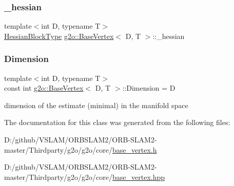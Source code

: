 \mbox{\label{classg2o_1_1_base_vertex_afaf73b0e874db76655d90bdb2f156c00}} 
\subsubsection{\texorpdfstring{\+\_\+hessian}{\_hessian}}
{\footnotesize\ttfamily template$<$int D, typename T$>$ \\
\mbox{\hyperlink{classg2o_1_1_base_vertex_a887928bc60710e0ec9acb269ee7411db}{Hessian\+Block\+Type}} \mbox{\hyperlink{classg2o_1_1_base_vertex}{g2o\+::\+Base\+Vertex}}$<$ D, T $>$\+::\+\_\+hessian\hspace{0.3cm}{\ttfamily [protected]}}

\mbox{\label{classg2o_1_1_base_vertex_a9a831bfdf84cfe625d8f942bc4f1c2d1}} 
\subsubsection{\texorpdfstring{Dimension}{Dimension}}
{\footnotesize\ttfamily template$<$int D, typename T$>$ \\
const int \mbox{\hyperlink{classg2o_1_1_base_vertex}{g2o\+::\+Base\+Vertex}}$<$ D, T $>$\+::Dimension = D\hspace{0.3cm}{\ttfamily [static]}}



dimension of the estimate (minimal) in the manifold space 



The documentation for this class was generated from the following files\+:\begin{DoxyCompactItemize}
\item 
D\+:/github/\+V\+S\+L\+A\+M/\+O\+R\+B\+S\+L\+A\+M2/\+O\+R\+B-\/\+S\+L\+A\+M2-\/master/\+Thirdparty/g2o/g2o/core/\mbox{\hyperlink{base__vertex_8h}{base\+\_\+vertex.\+h}}\item 
D\+:/github/\+V\+S\+L\+A\+M/\+O\+R\+B\+S\+L\+A\+M2/\+O\+R\+B-\/\+S\+L\+A\+M2-\/master/\+Thirdparty/g2o/g2o/core/\mbox{\hyperlink{base__vertex_8hpp}{base\+\_\+vertex.\+hpp}}\end{DoxyCompactItemize}
